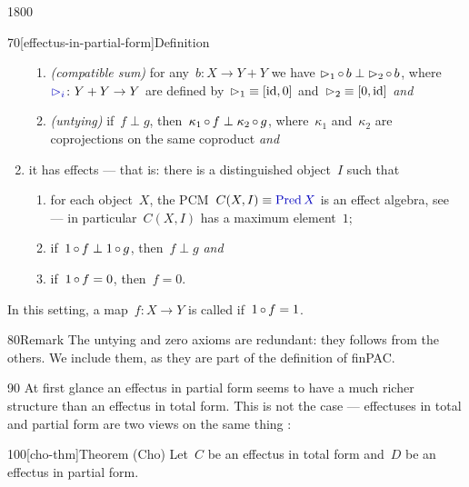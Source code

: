 \begin{parsec}{1800}
\begin{point}{70}[effectus-in-partial-form]{Definition}
\begin{enumerate}
\begin{enumerate}
        \item
            \emph{(compatible sum)}
            for any~$b\colon X \to Y + Y$ we have
            $\mathord{\vartriangleright}_1 \mathop{\circ} b \perp \mathord{\vartriangleright}_2 \mathop{\circ} b$,
            where~$\Define{\pproj_i}\colon Y + Y \to Y$
            are  defined
            by~$\mathord{\vartriangleright}_1 \equiv [\operatorname{id}, 0]$
            and~$\mathord{\vartriangleright}_2 \equiv [0, \operatorname{id}]$ \emph{and}
        \item
            \emph{(untying)} if~$f\perp g$,
            then~$\kappa_1\mathop{\circ} f \perp \kappa_2 \mathop{\circ} g$,
            where~$\kappa_1$ and~$\kappa_2$ are coprojections
            on the same coproduct
            \emph{and}
    \end{enumerate}
    \item it has effects --- that is: there is a distinguished object~$I$
            such that
    \begin{enumerate}
        \item for each object~$X$, the PCM~$C(X,I) \equiv \Define{\Pred X}$
            is an effect algebra, see 
            --- in particular~$C(X,I)$
                has a maximum element~$1$;
        \item if~$1 \mathop{\circ} f \perp 1 \mathop{\circ} g$,
            then~$f \perp g$ \emph{and}
        \item if~$1 \mathop{\circ} f = 0$, then~$f = 0$.
    \end{enumerate}
\end{enumerate}
In this setting,
a map~$f\colon X \to Y$ is called  if~$1 \mathop{\circ} f = 1$.
\begin{point}{80}{Remark}%
The untying and zero axioms are redundant: they follows from the others.
We include them, as they are part of the definition of finPAC.
\end{point}
\begin{point}{90}%
At first glance an effectus in partial form seems
    to have a much richer structure than an effectus in total form.
This is not the case ---
    effectuses in total and partial form are two views
    on the same thing \cite{kentapartial,effintro}:
\end{point}
\end{point}
\begin{point}{100}[cho-thm]{Theorem (Cho)}%
Let~$C$ be an effectus in total form
and~$D$ be an effectus in partial form.
\begin{enumerate}

\end{enumerate}
\end{point}
\end{parsec}
